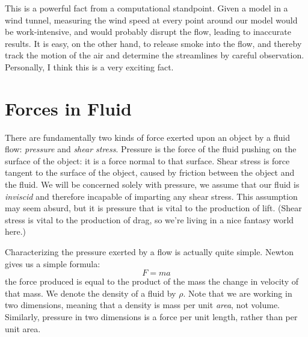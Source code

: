 \documentclass[letterpaper, twoside, 12 pt]{article}
\begin{document}
	This is a powerful fact from a computational standpoint.
	Given a model in a wind tunnel, measuring the wind speed at every point around our model would be work-intensive, and would probably disrupt the flow, leading to inaccurate results.
	It is easy, on the other hand, to release smoke into the flow, and thereby track the motion of the air and determine the streamlines by careful observation.
	Personally, I think this is a very exciting fact.

\section{Forces in Fluid} %
\label{sec:forces_in_fluid}

	There are fundamentally two kinds of force exerted upon an object by a fluid flow: \textit{pressure} and \textit{shear stress}.
	Pressure is the force of the fluid pushing on the surface of the object: it is a force normal to that surface.
	Shear stress is force tangent to the surface of the object, caused by friction between the object and the fluid.
	We will be concerned solely with pressure, we assume that our fluid is \textit{inviscid} and therefore incapable of imparting any shear stress.
	This assumption may seem absurd, but it is pressure that is vital to the production of lift.
	(Shear stress is vital to the production of drag, so we're living in a nice fantasy world here.)

	Characterizing the pressure exerted by a flow is actually quite simple.
	Newton gives us a simple formula:
	\[
		F = ma
	\]
	the force produced is equal to the product of the mass the change in velocity of that mass.
	We denote the density of a fluid by $\rho$.
	Note that we are working in two dimensions, meaning that a density is mass per unit \textit{area}, not volume.
	Similarly, pressure in two dimensions is a force per unit length, rather than per unit area.
\end{document}

